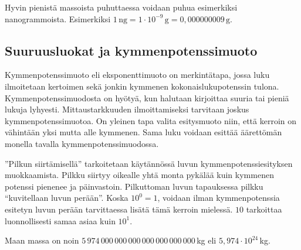 \begin{esimerkki}
Hyvin pienistä massoista puhuttaessa voidaan puhua esimerkiksi nanogrammoista. Esimerkiksi $1\,\textrm{ng} = 1 \cdot 10^{-9}\,\textrm{g} = 0,000000009\,\textrm{g} $.
\end{esimerkki}


\subsection*{Suuruusluokat ja kymmenpotenssimuoto}

Kymmenpotenssimuoto eli eksponenttimuoto on merkintätapa, jossa luku ilmoitetaan kertoimen sekä jonkin kymmenen kokonaislukupotenssin tulona. Kymmenpotenssimuodosta on hyötyä, kun halutaan kirjoittaa suuria tai pieniä lukuja lyhyesti. Mittaustarkkuuden ilmoittamiseksi tarvitaan joskus kymmenpotenssimuotoa. On yleinen tapa valita esitysmuoto niin, että kerroin on vähintään yksi mutta alle kymmenen. Sama luku voidaan esittää äärettömän monella tavalla kymmenpotenssimuodossa. 

”Pilkun siirtämisellä” tarkoitetaan käytännössä luvun kymmenpotenssiesityksen muokkaamista. Pilkku siirtyy oikealle yhtä monta pykälää kuin kymmenen potenssi pienenee ja päinvastoin. Pilkuttoman luvun tapauksessa pilkku ``kuvitellaan luvun perään''. Koska $10^0 = 1$, voidaan ilman kymmenpotenssia esitetyn luvun perään tarvittaessa lisätä tämä kerroin mielessä. $10$ tarkoittaa luonnollisesti samaa asiaa kuin $10^1$. 

\begin{esimerkki}
Maan massa on noin $5\,974\,000\,000\,000\,000\,000\,000\,000$\,kg  eli $5,974\cdot10^{24}$\,kg.
\end{esimerkki}

